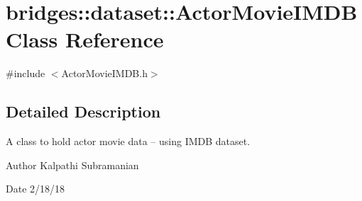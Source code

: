 \hypertarget{classbridges_1_1dataset_1_1_actor_movie_i_m_d_b}{}\section{bridges\+:\+:dataset\+:\+:Actor\+Movie\+I\+M\+DB Class Reference}
\label{classbridges_1_1dataset_1_1_actor_movie_i_m_d_b}


{\ttfamily \#include $<$Actor\+Movie\+I\+M\+D\+B.\+h$>$}



\subsection{Detailed Description}
A class to hold actor movie data -- using I\+M\+DB dataset. 

\begin{DoxyAuthor}{Author}
Kalpathi Subramanian 
\end{DoxyAuthor}
\begin{DoxyDate}{Date}
2/18/18 
\end{DoxyDate}
